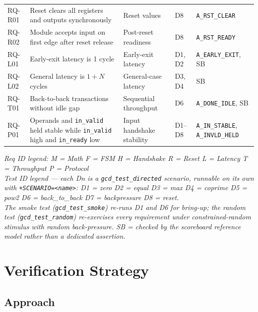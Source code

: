 \documentclass[11pt,a4paper]{article}
\begin{document}
{\begin{longtable}{@{}p{1.3cm} p{5.0cm} p{2.8cm} p{1.4cm} p{3.2cm}@{}}
RQ-R01 & Reset clears all registers and outputs synchronously & Reset values & D8 & \texttt{A\_RST\_CLEAR} \\

RQ-R02 & Module accepts input on first edge after reset release & Post-reset readiness & D8 & \texttt{A\_RST\_READY} \\

RQ-L01 & Early-exit latency is 1 cycle & Early-exit latency & D1, D2 & \texttt{A\_EARLY\_EXIT}, SB \\

RQ-L02 & General latency is $1+N$ cycles & General-case latency & D3, D4 & SB \\

RQ-T01 & Back-to-back transactions without idle gap & Sequential throughput & D6 & \texttt{A\_DONE\_IDLE}, SB \\

RQ-P01 & Operands and \texttt{in\_valid} held stable while \texttt{in\_valid} high and \texttt{in\_ready} low & Input handshake stability & D1--D8 & \texttt{A\_IN\_STABLE}, \texttt{A\_INVLD\_HELD} \\

\end{longtable}

\vspace{-0.5em}
{\scriptsize \itshape \color{gray!70!black}
Req ID legend: M = Math \quad F = FSM \quad H = Handshake \quad R = Reset \quad L = Latency \quad T = Throughput \quad P = Protocol \\
Test ID legend --- each D\textit{n} is a \texttt{gcd\_test\_directed} scenario, runnable on its own with \texttt{+SCENARIO=<name>}:
D1 = zero \quad D2 = equal \quad D3 = max \quad D4 = coprime \quad D5 = pow2 \quad D6 = back\_to\_back \quad D7 = backpressure \quad D8 = reset. \\
The smoke test (\texttt{gcd\_test\_smoke}) re-runs D1 and D6 for bring-up; the random test (\texttt{gcd\_test\_random}) re-exercises every requirement under constrained-random stimulus with random back-pressure. SB = checked by the scoreboard reference model rather than a dedicated assertion.
\par}
}

\section{Verification Strategy}

\subsection{Approach}
\end{document}

